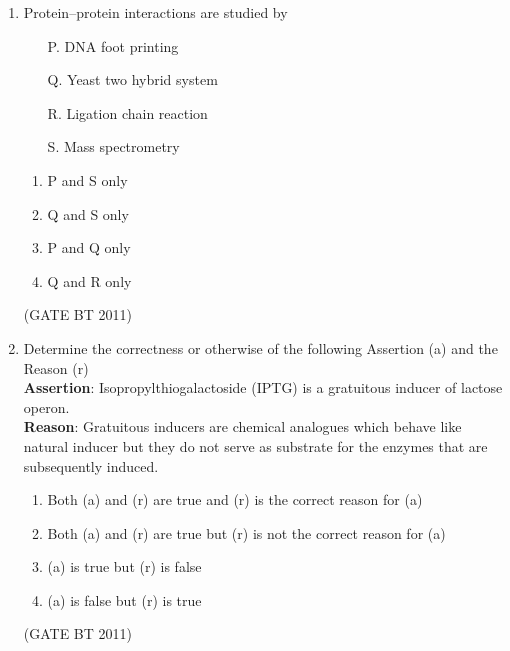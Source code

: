\documentclass[journal,12pt,onecolumn]{IEEEtran}
\begin{document}
\begin{enumerate}
  \begin{multicols}{2}
    \begin{enumerate}
      \item P-3, Q-4, R-1, S-2
      \item P-4, Q-3, R-2, S-1
      \item P-2, Q-3, R-1, S-4
      \item P-3, Q-2, R-4, S-1
    \end{enumerate}
  \end{multicols} \hfill(GATE BT 2011)

  \item Protein–protein interactions are studied by
  \begin{enumerate}
    \item[P.] DNA foot printing
    \item[Q.] Yeast two hybrid system
    \item[R.] Ligation chain reaction
    \item[S.] Mass spectrometry
  \end{enumerate}

  \begin{multicols}{2}
    \begin{enumerate}
      \item P and S only
      \item Q and S only
      \item P and Q only
      \item Q and R only
    \end{enumerate}
  \end{multicols} \hfill(GATE BT 2011)

  \item Determine the correctness or otherwise of the following Assertion (a) and the Reason (r) \\
  \textbf{Assertion}: Isopropylthiogalactoside (IPTG) is a gratuitous inducer of lactose operon. \\
  \textbf{Reason}: Gratuitous inducers are chemical analogues which behave like natural inducer but they do not serve as substrate for the enzymes that are subsequently induced.

    \begin{enumerate}
      \item Both (a) and (r) are true and (r) is the correct reason for (a)
      \item Both (a) and (r) are true but (r) is not the correct reason for (a)
      \item (a) is true but (r) is false
      \item (a) is false but (r) is true
    \end{enumerate}
    \hfill(GATE BT 2011)


\end{enumerate}
\end{document}
